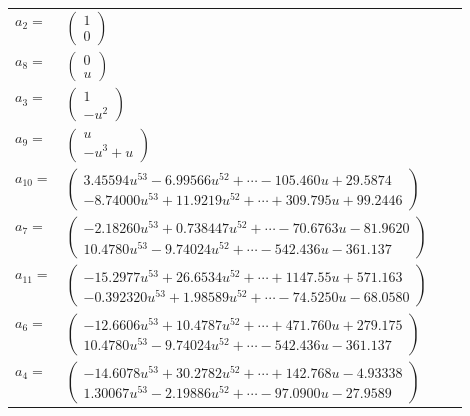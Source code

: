 \documentclass[1p]{elsarticle_modified}
\theoremstyle{definition}
\begin{document}
\begin{tabular}{m{7pt} m{180pt} m{7pt} m{180pt} }
\flushright $a_{2}=$&$\begin{pmatrix}1\\0\end{pmatrix}$ \\
\flushright $a_{8}=$&$\begin{pmatrix}0\\u\end{pmatrix}$ \\
\flushright $a_{3}=$&$\begin{pmatrix}1\\- u^2\end{pmatrix}$ \\
\flushright $a_{9}=$&$\begin{pmatrix}u\\- u^3+u\end{pmatrix}$ \\
\flushright $a_{10}=$&$\begin{pmatrix}3.45594 u^{53}-6.99566 u^{52}+\cdots-105.460 u+29.5874\\-8.74000 u^{53}+11.9219 u^{52}+\cdots+309.795 u+99.2446\end{pmatrix}$ \\
\flushright $a_{7}=$&$\begin{pmatrix}-2.18260 u^{53}+0.738447 u^{52}+\cdots-70.6763 u-81.9620\\10.4780 u^{53}-9.74024 u^{52}+\cdots-542.436 u-361.137\end{pmatrix}$ \\
\flushright $a_{11}=$&$\begin{pmatrix}-15.2977 u^{53}+26.6534 u^{52}+\cdots+1147.55 u+571.163\\-0.392320 u^{53}+1.98589 u^{52}+\cdots-74.5250 u-68.0580\end{pmatrix}$ \\
\flushright $a_{6}=$&$\begin{pmatrix}-12.6606 u^{53}+10.4787 u^{52}+\cdots+471.760 u+279.175\\10.4780 u^{53}-9.74024 u^{52}+\cdots-542.436 u-361.137\end{pmatrix}$ \\
\flushright $a_{4}=$&$\begin{pmatrix}-14.6078 u^{53}+30.2782 u^{52}+\cdots+142.768 u-4.93338\\1.30067 u^{53}-2.19886 u^{52}+\cdots-97.0900 u-27.9589\end{pmatrix}$ \\

\end{tabular}
\end{document}
